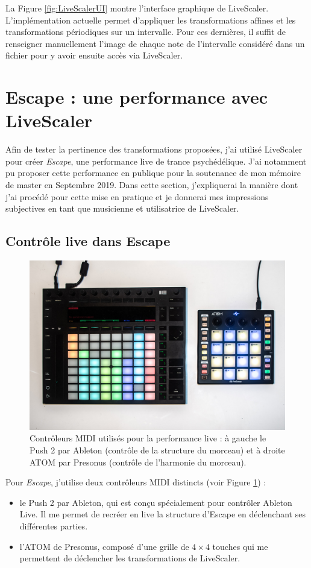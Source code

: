 \documentclass{article}
\begin{document}
La Figure \ref{fig:LiveScalerUI} montre l'interface graphique de LiveScaler. L'implémentation actuelle permet d'appliquer les transformations affines et les transformations périodiques sur un intervalle. Pour ces dernières, il suffit de renseigner manuellement l'image de chaque note de l'intervalle considéré dans un fichier pour y avoir ensuite accès via LiveScaler.





\section{Escape : une performance avec LiveScaler }
Afin de tester la pertinence des transformations proposées, j'ai utilisé LiveScaler pour créer \emph{Escape}, une performance live de trance psychédélique. J'ai notamment pu proposer cette performance en publique pour la soutenance de mon mémoire de master en Septembre 2019. Dans cette section, j'expliquerai la manière dont j'ai procédé pour cette mise en pratique et je donnerai mes impressions subjectives en tant que musicienne et utilisatrice de LiveScaler.


\subsection{Contrôle live dans Escape}
\begin{figure}[htbp]
  \centering
  \includegraphics[width=\columnwidth]{Figures/IMGP9899.jpg}
  \caption{Contrôleurs MIDI utilisés pour la performance live : à gauche le Push 2 par Ableton (contrôle de la structure du morceau) et à droite ATOM par Presonus (contrôle de l'harmonie du morceau).\label{fig:controleurs}}
\end{figure}
Pour \emph{Escape}, j'utilise deux contrôleurs MIDI distincts (voir Figure \ref{fig:controleurs}) :
\begin{itemize}
  \item le Push 2 par Ableton, qui est conçu spécialement pour contrôler Ableton Live. Il me permet de recréer en live la structure d'Escape en déclenchant ses différentes parties.
  \item l'ATOM de Presonus, composé d'une grille de $4\times 4$ touches qui me permettent de déclencher les transformations de LiveScaler.
\end{itemize}
\end{document}
